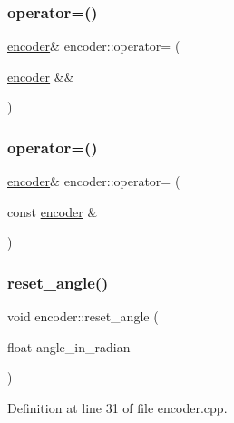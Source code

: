 \subsubsection{\texorpdfstring{operator=()}{operator=()}\hspace{0.1cm}{\footnotesize\ttfamily [1/2]}}
{\footnotesize\ttfamily \mbox{\hyperlink{classencoder}{encoder}}\& encoder\+::operator= (\begin{DoxyParamCaption}\item[{\mbox{\hyperlink{classencoder}{encoder}} \&\&}]{ }\end{DoxyParamCaption})\hspace{0.3cm}{\ttfamily [default]}}

\mbox{\label{classencoder_a9916948157fd30beeaf0fb141c356e2d}} 
\subsubsection{\texorpdfstring{operator=()}{operator=()}\hspace{0.1cm}{\footnotesize\ttfamily [2/2]}}
{\footnotesize\ttfamily \mbox{\hyperlink{classencoder}{encoder}}\& encoder\+::operator= (\begin{DoxyParamCaption}\item[{const \mbox{\hyperlink{classencoder}{encoder}} \&}]{ }\end{DoxyParamCaption})\hspace{0.3cm}{\ttfamily [default]}}

\mbox{\label{classencoder_af37dc5bf8a2323a500dd55f5fef12afb}} 
\subsubsection{\texorpdfstring{reset\_angle()}{reset\_angle()}}
{\footnotesize\ttfamily void encoder\+::reset\+\_\+angle (\begin{DoxyParamCaption}\item[{float}]{angle\+\_\+in\+\_\+radian }\end{DoxyParamCaption})}



Definition at line 31 of file encoder.\+cpp.

